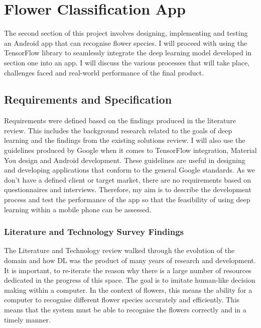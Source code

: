 \documentclass[12pt,a4paper]{report}
\begin{document}
\clearpage

\chapter{Flower Classification App}

The second section of this project involves designing, implementing and testing an Android app that can recognise flower
species. I will proceed with using the TensorFlow library to seamlessly integrate the deep learning model developed in 
section one into an app. I will discuss the various processes that will take place, challenges faced and real-world 
performance of the final product.

\section{Requirements and Specification}

\label{subsec:req}

Requirements were defined based on the findings produced in the literature review. This includes the background research 
related to the goals of deep learning and the findings from the existing solutions review. I will also use the 
guidelines produced by Google when it comes to TensorFlow integration, Material You design and Android development. 
These guidelines are useful in designing and developing applications that conform to the general Google standards. As we
don't have a defined client or target market, there are no requirements based on questionnaires and interviews. 
Therefore, my aim is to describe the development process and test the performance of the app so that the feasibility of 
using deep learning within a mobile phone can be assessed. 

\subsection{Literature and Technology Survey Findings}

The Literature and Technology review walked through the evolution of the domain and how DL was the product of many years
of research and development. It is important, to re-iterate the reason why there is a large number of resources 
dedicated in the progress of this space. The goal is to imitate human-like decision making within a computer. In the 
context of flowers, this means the ability for a computer to recognise different flower species accurately and 
efficiently. This means that the system must be able to recognise the flowers correctly and in a timely manner.
\end{document}

